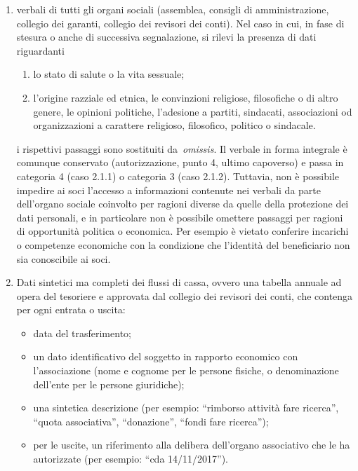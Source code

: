 \begin{enumerate}
    \item
        verbali di tutti gli organi sociali (assemblea, consigli di
        amministrazione, collegio dei garanti, collegio dei revisori dei
        conti). Nel caso in cui, in fase di stesura o anche di successiva
        segnalazione, si rilevi la presenza di dati riguardanti
        \begin{enumerate}
            \item lo stato di salute o la vita sessuale;
            \item l'origine razziale ed etnica, le
                convinzioni religiose, filosofiche o di altro genere, le opinioni
                politiche, l'adesione a partiti, sindacati, associazioni od
                organizzazioni a carattere religioso, filosofico, politico o
                sindacale.
        \end{enumerate}
        i rispettivi passaggi sono sostituiti da~\emph{omissis}. Il verbale in
        forma integrale è comunque conservato (autorizzazione, punto 4, ultimo
        capoverso) e passa in categoria 4 (caso 2.1.1) o categoria 3 (caso
        2.1.2). Tuttavia, non è possibile impedire ai soci l'accesso a
        informazioni contenute nei verbali da parte dell'organo sociale
        coinvolto per ragioni diverse da quelle della protezione dei dati
        personali, e in particolare non è possibile omettere passaggi per
        ragioni di opportunità politica o economica. Per esempio è vietato
        conferire incarichi o competenze economiche con la condizione che
        l'identità del beneficiario non sia conoscibile ai soci.
    \item
        Dati sintetici ma completi dei flussi di cassa, ovvero una tabella
        annuale ad opera del tesoriere e approvata dal collegio dei revisori
        dei conti, che contenga per ogni entrata o uscita:
        \begin{itemize}
            \item data del trasferimento;
            \item un dato identificativo del soggetto in rapporto economico con l'associazione (nome e cognome per le persone fisiche, o denominazione dell'ente per le persone giuridiche);
            \item una sintetica descrizione (per esempio: ``rimborso attività fare ricerca'', ``quota associativa'', ``donazione'', ``fondi fare ricerca'');
            \item per le uscite, un riferimento alla delibera dell'organo associativo che le ha autorizzate (per esempio: ``cda 14/11/2017'').

\end{itemize}
\end{enumerate}
